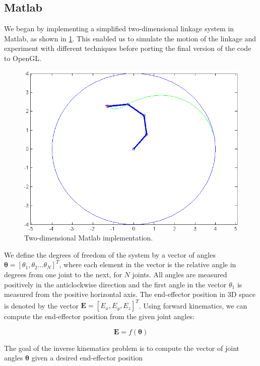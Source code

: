 \documentclass[paper=a4, fontsize=11pt]{scrartcl} %
\numberwithin{equation}{section} %
\numberwithin{figure}{section} %
\numberwithin{table}{section} %
\newcommand{\vect}[1]{\mathbf{#1}}
\newcommand{\params}{\boldsymbol{\theta}}
\begin{document}
\subsection{Matlab}

We began by implementing a simplified two-dimensional linkage system in Matlab, as shown in \ref{fig:Matlabpicture}. This enabled us to simulate the motion of the linkage and experiment with different techniques before porting the final version of the code to OpenGL. \\

\begin{figure}
\centering
\includegraphics[scale=0.6]{chainMatlab}
\caption{Two-dimensional Matlab implementation.}
\label{fig:Matlabpicture}
\end{figure}

We define the degrees of freedom of the system by a vector of angles $\params = [\theta_1, \theta_2...\theta_N]^T$, where each element in the vector is the relative angle in degrees from one joint to the next, for $N$ joints. All angles are measured positively in the anticlockwise direction and the first angle in the vector $\theta_1$ is measured from the positive horizontal axis. The end-effector position in 3D space is denoted by the vector 
$\vect{E} = [E_x, E_y, E_z]^T$. Using forward kinematics, we can compute the end-effector position from the given joint angles:

\begin{equation}
\vect{E} = f(\params)
\end{equation}

The goal of the inverse kinematics problem is to compute the vector of joint angles $\params$ given a desired end-effector position
\end{document}
